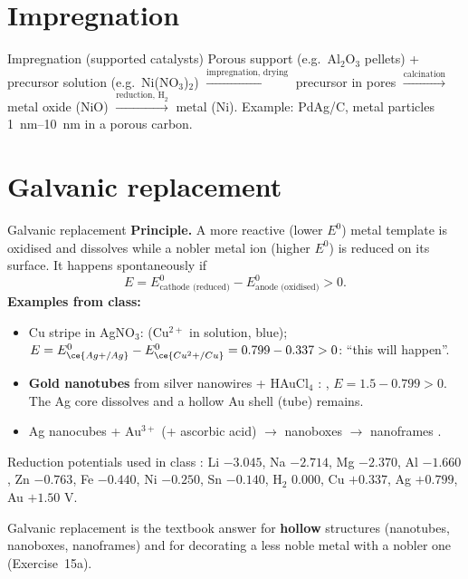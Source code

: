 \section{Impregnation}
\begin{cardbox}{Impregnation (supported catalysts) }
Porous support (e.g.\ Al$_2$O$_3$ pellets) + precursor solution (e.g.\ Ni(NO$_3$)$_2$) $\xrightarrow{\text{impregnation, drying}}$
precursor in pores $\xrightarrow{\text{calcination}}$ metal oxide (NiO) $\xrightarrow{\text{reduction, H}_2}$ metal (Ni).
Example: PdAg/C, metal particles \SIrange{1}{10}{nm} in a porous carbon.
\end{cardbox}

\section{Galvanic replacement}
\begin{cardbox}{Galvanic replacement }
\textbf{Principle.} A more reactive (lower $E^0$) metal template is oxidised and dissolves while a nobler metal ion
(higher $E^0$) is reduced on its surface. It happens spontaneously if
\[
\boxed{E = E^0_\text{cathode (reduced)} - E^0_\text{anode (oxidised)} > 0.}
\]
\textbf{Examples from class:}
\begin{itemize}
  \item Cu stripe in AgNO$_3$:  (Cu$^{2+}$ in solution, blue);
        $E = E^0_{\ce{Ag+/Ag}} - E^0_{\ce{Cu^2+/Cu}} = 0.799 - 0.337 > 0$: ``this will happen''.
  \item \textbf{Gold nanotubes} from silver nanowires + HAuCl$_4$ :
        , $E = 1.5 - 0.799 > 0$.
        The Ag core dissolves and a hollow Au shell (tube) remains.
  \item Ag nanocubes + Au$^{3+}$ (+ ascorbic acid) $\to$ nanoboxes $\to$ nanoframes .
\end{itemize}
\end{cardbox}
Reduction potentials used in class : Li $-3.045$, Na $-2.714$, Mg $-2.370$, Al $-1.660$, Zn $-0.763$,
Fe $-0.440$, Ni $-0.250$, Sn $-0.140$, H$_2$ $0.000$, Cu $+0.337$, Ag $+0.799$, Au $+1.50$ V.
\begin{tipbox}
Galvanic replacement is the textbook answer for \textbf{hollow} structures (nanotubes, nanoboxes, nanoframes) and for
decorating a less noble metal with a nobler one (Exercise~15a).
\end{tipbox}

